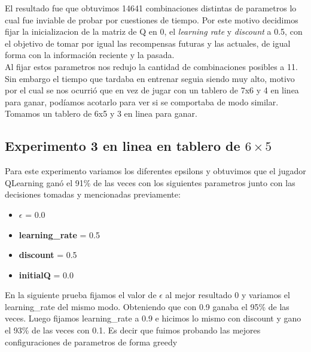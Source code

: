 El resultado fue que obtuvimos 14641 combinaciones distintas de parametros lo cual fue inviable de probar por cuestiones
 de tiempo. Por este motivo decidimos fijar la inicializacion de la matriz de Q en 0, el \textit{learning rate} y
  \textit{discount} a 0.5, con el objetivo de tomar por igual las recompensas futuras y las actuales, de igual forma
   con la información reciente y la pasada. \\

Al fijar estos parametros nos redujo la cantidad de combinaciones posibles a 11. Sin embargo el tiempo que tardaba en entrenar
 seguia siendo muy alto, motivo por el cual se nos ocurrió que en vez de jugar con un tablero de 7x6 y 4 en linea para ganar,
  podíamos acotarlo para ver si se comportaba de modo similar. Tomamos un tablero de 6x5 y 3 en linea para ganar.



\subsection{Experimento 3 en linea en tablero de $6\times5$}
Para este experimento variamos los diferentes epsilons y obtuvimos que el jugador QLearning ganó el 91\% de las veces con los
siguientes parametros junto con las decisiones tomadas y mencionadas previamente: \\

\begin{itemize}
  \item  \textbf{$\epsilon$} = 0.0
  \item \textbf{learning\_rate} = 0.5
  \item \textbf{discount} = 0.5
  \item \textbf{initialQ} = 0.0
\end{itemize}



En la siguiente prueba fijamos el valor de $\epsilon$ al mejor resultado 0 y  variamos el learning\_rate del mismo modo.
Obteniendo que con 0.9 ganaba el 95\% de las veces. Luego fijamos learning\_rate a 0.9 e hicimos lo mismo con discount y
gano el 93\% de las veces con 0.1. Es decir que fuimos probando las mejores configuraciones de parametros de forma greedy \\


